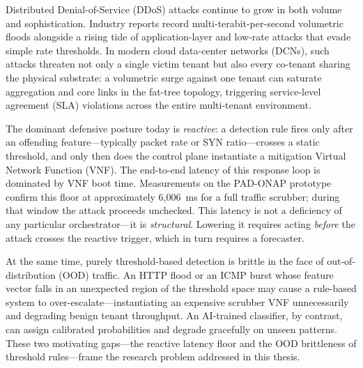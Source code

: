 \label{ch:intro}

\pagestyle{fancy}


Distributed Denial-of-Service (DDoS) attacks continue to grow in both
volume and sophistication. Industry reports record multi-terabit-per-second
volumetric floods alongside a rising tide of application-layer and
low-rate attacks that evade simple rate thresholds. In modern cloud
data-center networks (DCNs), such attacks threaten not only a single
victim tenant but also every co-tenant sharing the physical substrate:
a volumetric surge against one tenant can saturate aggregation and core
links in the fat-tree topology, triggering service-level agreement (SLA)
violations across the entire multi-tenant environment.

The dominant defensive posture today is \emph{reactive}: a detection rule
fires only after an offending feature---typically packet rate or SYN
ratio---crosses a static threshold, and only then does the control plane
instantiate a mitigation Virtual Network Function (VNF). The end-to-end
latency of this response loop is dominated by VNF boot time. Measurements
on the PAD-ONAP prototype confirm this floor at approximately 6{,}006~ms
for a full traffic scrubber; during that window the attack proceeds
unchecked. This latency is not a deficiency of any particular
orchestrator---it is \emph{structural}. Lowering it requires acting
\emph{before} the attack crosses the reactive trigger, which in turn
requires a forecaster.

At the same time, purely threshold-based detection is brittle in the face
of out-of-distribution (OOD) traffic. An HTTP flood or an ICMP burst whose
feature vector falls in an unexpected region of the threshold space may
cause a rule-based system to over-escalate---instantiating an expensive
scrubber VNF unnecessarily and degrading benign tenant throughput. An
AI-trained classifier, by contrast, can assign calibrated probabilities
and degrade gracefully on unseen patterns. These two motivating gaps---the
reactive latency floor and the OOD brittleness of threshold rules---frame
the research problem addressed in this thesis.

